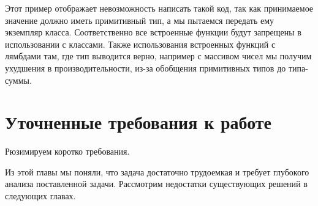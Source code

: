 Этот пример отображает невозможность написать такой код, так как принимаемое значение должно иметь примитивный тип, а мы пытаемся передать ему экземпляр класса.
Соответственно все встроенные функции будут запрещены в использовании с классами.
Также использования встроенных функций с лямбдами там, где тип выводится верно, например с массивом чисел мы получим ухудшения в производительности, из-за обобщения примитивных типов до типа-суммы.


\section{Уточненные требования к работе}
Рюзимируем коротко требования.

\chapterconclusion
Из этой главы мы поняли, что задача достаточно трудоемкая и требует глубокого анализа поставленной задачи.
Рассмотрим недостатки существующих решений в следующих главах.

